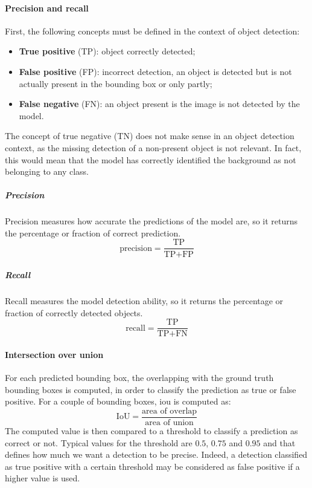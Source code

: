\documentclass[%
    corpo=12pt,
    twoside,
    stile=classica,   
    tipotesi=magistrale,
    evenboxes,
    english,
	numerazioneromana,
]{toptesi}
\begin{document}
\paragraph{Precision and recall}
First, the following concepts must be defined in the context of object detection:
\begin{itemize}
	\item \textbf{True positive} (TP): object correctly detected;
	\item \textbf{False positive} (FP): incorrect detection, an object is detected but is not actually present in the bounding box or only partly;
	\item \textbf{False negative} (FN): an object present is the image is not detected by the model.
\end{itemize}
The concept of true negative (TN) does not make sense in an object detection context, as the missing detection of a non-present object is not relevant. In fact, this would mean that the model has correctly identified the background as not belonging to any class.

\subparagraph{Precision}
Precision measures how accurate the predictions of the model are, so it returns the percentage or fraction of correct prediction.
\begin{equation}
	\text{precision} = \frac{\text{TP}}{\text{TP}+\text{FP}}
\end{equation}

\subparagraph{Recall}
Recall measures the model detection ability, so it returns the percentage or fraction of correctly detected objects.
\begin{equation}
	\text{recall} = \frac{\text{TP}}{\text{TP}+\text{FN}}
\end{equation}

\paragraph{Intersection over union}
For each predicted bounding box, the overlapping with the ground truth bounding boxes is computed, in order to classify the prediction as true or false positive. For a couple of bounding boxes, \gls{iou} is computed as:
\begin{equation}
	\text{IoU} = \frac{\text{area of overlap}}{\text{area of union}}
\end{equation}
The computed value is then compared to a threshold to classify a prediction as correct or not. Typical values for the threshold are $0.5$, $0.75$ and $0.95$ and that defines how much we want a detection to be precise. Indeed, a detection classified as true positive with a certain threshold may be considered as false positive if a higher value is used.
\end{document}
